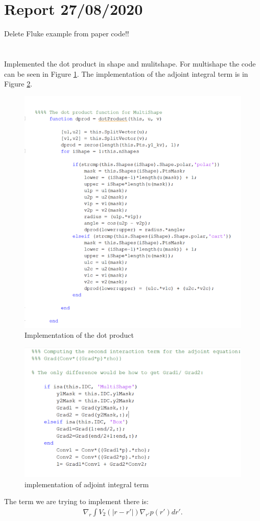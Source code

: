 \documentclass[11pt, a4paper]{article}
\theoremstyle{definition}
\begin{document}
	\section*{Report 27/08/2020}
	Delete Fluke example from paper code!!\\
	\\
	\\
	Implemented the dot product in shape and mulitshape. For multishape the code can be seen in Figure \ref{FCode1}. The implementation of the adjoint integral term is in Figure \ref{FCode2}.
	\begin{figure}[h]
		\centering
		\includegraphics[scale=0.9]{dotProduct.png}
		\caption{Implementation of the dot product} 
		\label{FCode1}
	\end{figure}
	\begin{figure}[h]
	\centering
	\includegraphics[scale=0.9]{adjoint.png}
	\caption{implementation of adjoint integral term} 
	\label{FCode2}
    \end{figure}
	The term we are trying to implement there is:
	\begin{align*}
	\nabla_r \int   V_2(|r-r'|)\nabla_{r'} p(r')dr'.
	\end{align*} 
\end{document}

